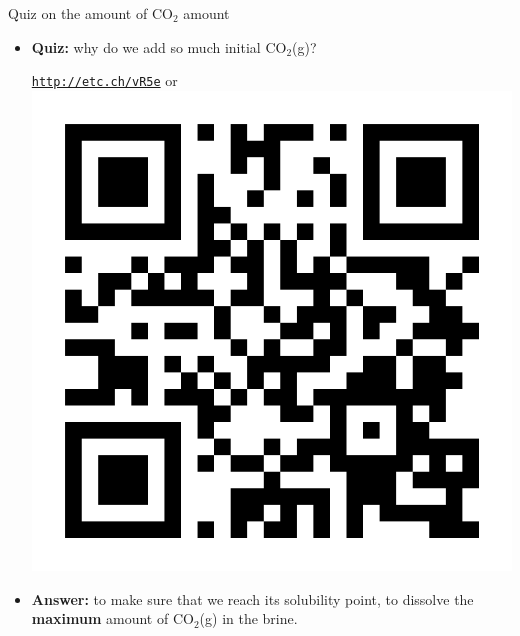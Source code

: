 %
\begin{frame}{Quiz on the amount of CO$_2$ amount}
		
		\begin{itemize}
			\item \alert{\textbf{Quiz:}} why do we add so much initial CO$_2$(g)?
			\vskip 10pt
			\begin{center}
				\href{http://etc.ch/vR5e}{\textcolor{indigo(dye)}{\tt http://etc.ch/vR5e}} \quad or \quad 
				\includegraphics[height=0.2\columnwidth]{figures/computational-projects/polls.png}
			\end{center}
			\vskip 10pt
			\hiddenpause
			\vskip 10pt
			\item {\textbf{Answer:}} to make sure that we reach its solubility point, to dissolve the {\bf maximum} amount of CO$_2$(g) in the brine.
		\end{itemize}
	
\end{frame}
